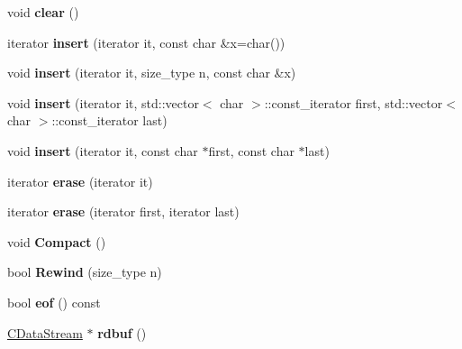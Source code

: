 \begin{DoxyCompactItemize}
void {\bfseries clear} ()
\item 
\mbox{\label{class_c_data_stream_a191a18802fbc0861ae118d79d33088dc}} 
iterator {\bfseries insert} (iterator it, const char \&x=char())
\item 
\mbox{\label{class_c_data_stream_ac8fa6a4a4cd08da5a0c87180834611e5}} 
void {\bfseries insert} (iterator it, size\+\_\+type n, const char \&x)
\item 
\mbox{\label{class_c_data_stream_aa15a60d7ee6d987de444426f2825f284}} 
void {\bfseries insert} (iterator it, std\+::vector$<$ char $>$\+::const\+\_\+iterator first, std\+::vector$<$ char $>$\+::const\+\_\+iterator last)
\item 
\mbox{\label{class_c_data_stream_a9635fda38bc0b7836b4364820a67a18d}} 
void {\bfseries insert} (iterator it, const char $\ast$first, const char $\ast$last)
\item 
\mbox{\label{class_c_data_stream_acb2a195db823f11161ea07c4855e0333}} 
iterator {\bfseries erase} (iterator it)
\item 
\mbox{\label{class_c_data_stream_a7446b23bcfa37cbfa79ccc66f8aff48a}} 
iterator {\bfseries erase} (iterator first, iterator last)
\item 
\mbox{\label{class_c_data_stream_a84c3fd4cf194f3402dc8adce6ab3ccf9}} 
void {\bfseries Compact} ()
\item 
\mbox{\label{class_c_data_stream_a7054311b2fe016b21fb853a1e27812d9}} 
bool {\bfseries Rewind} (size\+\_\+type n)
\item 
\mbox{\label{class_c_data_stream_ac6b34149b7eea928c925100dfe10c087}} 
bool {\bfseries eof} () const
\item 
\mbox{\label{class_c_data_stream_a45a08b8355d47a95e9dae87ed6487483}} 
\mbox{\hyperlink{class_c_data_stream}{C\+Data\+Stream}} $\ast$ {\bfseries rdbuf} ()
\item 
\mbox{\label{class_c_data_stream_a0483fe7bccf16aa88bf7272f18a0a7b0}} 

\end{DoxyCompactItemize}

